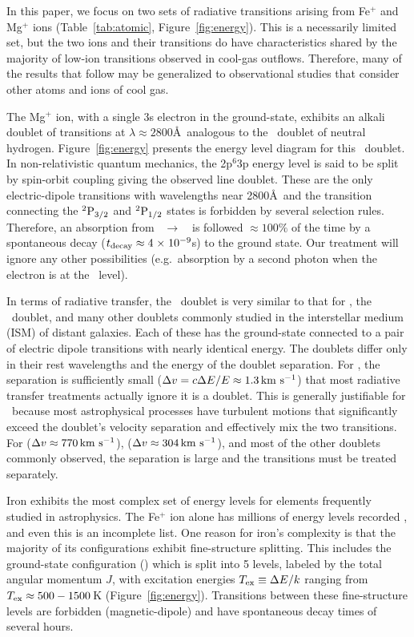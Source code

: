 \documentclass[12pt,preprint]{aastex}
\begin{document}
In this paper, we focus on two sets of radiative transitions
arising from Fe$^+$ and Mg$^+$ ions
(Table~\ref{tab:atomic}, Figure~\ref{fig:energy}).
This is a necessarily limited
set, but the two ions and their transitions do have characteristics
shared by the majority of low-ion transitions
observed in cool-gas outflows. Therefore, many
of the results that follow may be generalized to observational studies that
consider other atoms and ions of cool gas.

The Mg$^+$ ion, with a single 3s electron in the ground-state,
exhibits an alkali doublet of transitions at $\lambda \approx
2800$\AA\ analogous to the
\lya\ doublet of neutral hydrogen.  Figure~\ref{fig:energy}
presents the energy level diagram for this 
\mgiid\ doublet.  In non-relativistic quantum
mechanics, the 2p$^6$3p energy level is said to be split by spin-orbit
coupling giving the observed line doublet.  These are the only
 electric-dipole transitions 
with wavelengths near 2800\AA\ and the transition connecting
the $\rm {}^2P_{3/2}$ and $\rm {}^2P_{1/2}$ states is forbidden by several
selection rules.  Therefore, an absorption from
\maconfig~$\to$~\mbconfig\
is followed $\approx 100\%$ of the time by a spontaneous decay
($t_{\rm decay} \approx 4{\; \times \; 10^{-9}}$s) to the
ground state. Our treatment will ignore any other possibilities
(e.g.\ absorption by a second photon when the electron is at the \mbconfig\ level).

In terms of radiative transfer, the 
\mgiid\ doublet is very similar to that for 
\lya, the \naid\ doublet, and many other doublets commonly
studied in the interstellar medium (ISM) of distant galaxies.  
Each of these has the ground-state connected to a pair of electric
dipole transitions with nearly identical energy.
The doublets differ only in 
their rest wavelengths and the energy of the doublet separation. 
For \ion{H}{1} \lya, the
separation is sufficiently small ($\Delta v = c \Delta E / E \approx
1.3 \, {\rm km~s^{-1}}$) that most radiative transfer treatments actually ignore it
is a doublet.
This is generally justifiable for \lya\ because 
most astrophysical processes have turbulent motions that
significantly exceed the doublet's velocity separation and effectively mix the
two transitions.  For \ion{Mg}{2} ($\Delta v \approx 770 \, {\rm km~s^{-1}}$),  
\ion{Na}{1} ($\Delta v \approx 304 \, {\rm km~s^{-1}}$), and most of the other doublets
commonly observed, the separation is large and the transitions
must be treated separately.  

Iron exhibits the most complex set of energy levels for elements
frequently studied in astrophysics.  The Fe$^+$ ion alone has 
millions of energy levels recorded \citep{kurucz05}, and even this is an
incomplete list.  
One reason for iron's complexity is
that the majority of its configurations exhibit fine-structure splitting.
This includes the ground-state configuration (\aconfig) which is split
into 5 levels, 
labeled by the total angular momentum $J$, 
with excitation energies $T_{\rm ex} \equiv \Delta E / k$ ranging from
$T_{\rm ex} \approx 500-1500$\,K (Figure~\ref{fig:energy}).  
Transitions between these fine-structure levels are 
forbidden (magnetic-dipole) and have spontaneous decay times of several hours.  
\end{document}
